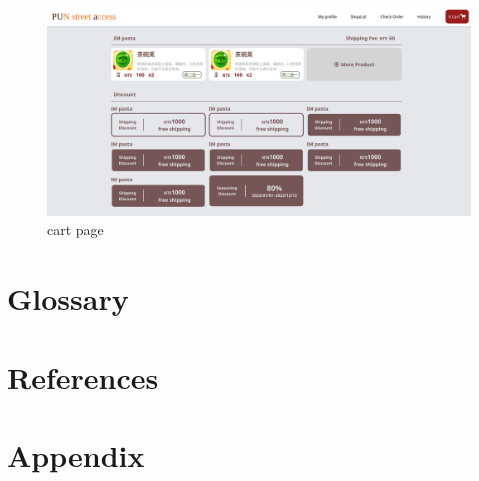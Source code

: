 \documentclass[a4paper, 12pt]{article}
\begin{document}
\begin{figure}[hp]
    \centerline{\includegraphics[width=40em]{pic/cart.png}}    
    \caption{cart page}
    \label{fig:enter-label}
\end{figure}

\newpage

\section{Glossary}
\newpage


\section{References}
\printbibliography[heading=none]
\newpage

\section{Appendix}
\newpage
\end{document}
